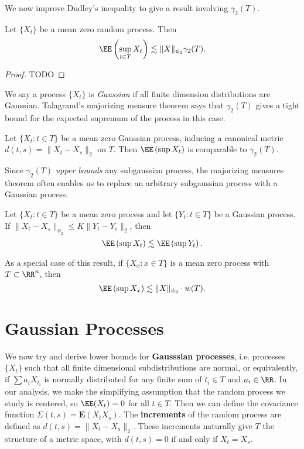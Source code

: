 We now improve Dudley's inequality to give a result involving $\gamma_2(T)$.

\begin{theorem}
	Let $\{ X_t \}$ be a mean zero random process. Then
	\[ \EE \left( \sup_{t \in T} X_t \right) \lesssim \| X \|_{\psi_2} \gamma_2(T). \]
\end{theorem}
\begin{proof}
	TODO
\end{proof}

We say a process $\{ X_t \}$ is {\it Gaussian} if all finite dimension distributions are Gaussian. Talagrand's majorizing measure theorem says that $\gamma_2(T)$ gives a tight bound for the expected supremum of the process in this case.

\begin{theorem}
	Let $\{ X_t : t \in T \}$ be a mean zero Gaussian process, inducing a canonical metric $d(t,s) = \| X_t - X_s \|_2$ on $T$. Then $\EE \left( \sup X_t \right)$ is comparable to $\gamma_2(T)$.
\end{theorem}

Since $\gamma_2(T)$ {\it upper bounds} any subgaussian process, the majorizing measures theorem often enables us to replace an arbitrary subgaussian process with a Gaussian process.

\begin{corollary}
	Let $\{ X_t : t \in T \}$ be a mean zero process and let $\{ Y_t : t \in T \}$ be a Gaussian process. If $\| X_t - X_s \|_{\psi_2} \leq K \| Y_t - Y_s \|_2$, then
	\[ \EE \left( \sup X_t \right) \lesssim \EE \left( \sup Y_t \right). \]
\end{corollary}

As a special case of this result, if $\{ X_x : x \in T \}$ is a mean zero process with $T \subset \RR^n$, then
%
\[ \EE \left( \sup X_x \right) \lesssim \| X \|_{\psi_2} \cdot w(T). \]

\chapter{Gaussian Processes}

We now try and derive lower bounds for \textbf{Gausssian processes}, i.e. processes $\{ X_t \}$ such that all finite dimensional subdistributions are normal, or equivalently, if $\sum a_i X_{t_i}$ is normally distributed for any finite sum of $t_i \in T$ and $a_i \in \RR$. In our analysis, we make the simplifying assumption that the random process we study is centered, so $\EE(X_t) = 0$ for all $t \in T$. Then we can define the covariance function $\Sigma(t,s) = \mathbf{E}(X_t X_s)$. The \textbf{increments} of the random process are defined as $d(t,s) = \| X_t - X_s \|_2$.  These increments naturally give $T$ the structure of a metric space, with $d(t,s) = 0$ if and only if $X_t = X_s$.

